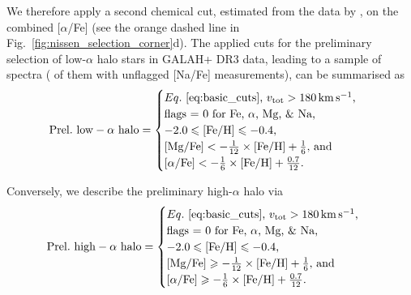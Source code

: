 \documentclass[fleqn,usenatbib]{mnras}
\begin{document}
We therefore apply a second chemical cut, estimated from the data by \citet{Nissen2010}, on the combined [$\alpha$/Fe] (see the orange dashed line in Fig.~\ref{fig:nissen_selection_corner}d). The applied cuts for the preliminary selection of low-$\alpha$ halo stars in GALAH+ DR3 data, leading to a sample of  spectra ( of them with unflagged [Na/Fe] measurements), can be summarised as
\begin{equation} \label{eq:prelim_low_alpha_halo}
\mathrm{Prel.~low-\alpha~halo} =
\begin{cases}
Eq.~\ref{eq:basic_cuts}\text{, }v_\text{tot} > 180\,\mathrm{km\,s^{-1}} \text{, } \\
\text{flags = 0 for Fe, }\alpha\text{, Mg, \& Na, } \\
-2.0 \leq \mathrm{[Fe/H]} \leq -0.4 \text{, }\\
\mathrm{[Mg/Fe]} < - \frac{1}{12} \times \mathrm{[Fe/H]} + \frac{1}{6} \text{, and}\\
\mathrm{[\alpha/Fe]} < - \frac{1}{6} \times \mathrm{[Fe/H]} + \frac{0.7}{12}.\\
\end{cases}
\end{equation}

Conversely, we describe the preliminary high-$\alpha$ halo via
\begin{equation} \label{eq:prelim_high_alpha_halo}
\mathrm{Prel.~high-\alpha~halo} =
\begin{cases}
Eq.~\ref{eq:basic_cuts}\text{, } v_\text{tot} > 180\,\mathrm{km\,s^{-1}} \text{, } \\
\text{flags = 0 for Fe, }\alpha\text{, Mg, \& Na, } \\
-2.0 \leq \mathrm{[Fe/H]} \leq -0.4 \text{, }\\
\mathrm{[Mg/Fe]} \geq - \frac{1}{12} \times \mathrm{[Fe/H]} + \frac{1}{6} \text{, and}\\
\mathrm{[\alpha/Fe]} \geq - \frac{1}{6} \times \mathrm{[Fe/H]} + \frac{0.7}{12}.\\
\end{cases}
\end{equation}
\end{document}

